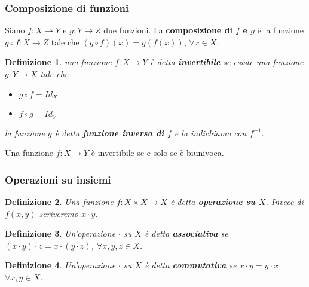 \documentclass[a4paper,12pt]{article}
\theoremstyle{def}
\newtheorem*{definition}{Definizione}
\theoremstyle{prop}
\theoremstyle{esempio}
\theoremstyle{dimostrazione}
\theoremstyle{teo}
\theoremstyle{osservazione}
\begin{document}
\subsubsection{Composizione di funzioni}
Siano \(f: X \rightarrow Y\) e \(g: Y \rightarrow Z\) due funzioni. La \textbf{composizione di \(f\) e \(g\)}
è la funzione \(g \circ f : X \rightarrow Z\) tale che \((g \circ f)(x) = g(f(x))\), \(\forall x \in X\).

\begin{definition}
    una funzione \(f: X \rightarrow Y\) è detta \textbf{invertibile} se esiste una funzione \(g: Y \rightarrow X\) tale che
    \begin{itemize}
        \item \(g \circ f = Id_X\)
        \item \(f \circ g = Id_Y\)
    \end{itemize}
    la funzione \(g\) è detta \textbf{funzione inversa di \(f\)} e la indichiamo con \(f^{-1}\).
\end{definition}

Una funzione \(f: X \rightarrow Y\) è invertibile se e solo se è biunivoca.

\subsubsection{Operazioni su insiemi}

\begin{definition}
    Una funzione \(f: X \times X \rightarrow X\) è detta \textbf{operazione su \(X\)}. Invece di \(f(x,y)\)
    scriveremo \(x \cdot y\).
\end{definition}

\begin{definition}
    Un'operazione \(\cdot\) su \(X\) è detta \textbf{associativa} se \((x \cdot y) \cdot z = x \cdot (y \cdot z)\),
    \(\forall x,y,z \in X\).
\end{definition}

\begin{definition}
    Un'operazione \(\cdot\) su \(X\) è detta \textbf{commutativa} se \(x \cdot y = y \cdot x\), \(\forall x,y \in X\).
\end{definition}
\end{document}
